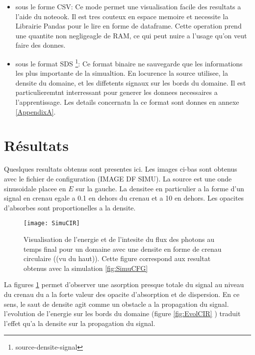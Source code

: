 \begin{itemize}
 \item sous le forme CSV: Ce mode permet une visualisation facile des resultats a l'aide du noteook. Il est tres couteux en espace memoire et necessite la Librairie Pandas pour le lire en forme de dataframe. Cette operation prend une quantite non negligeagle de RAM, ce qui peut nuire a l'usage qu'on veut faire des donnes.
 
 \item sous le format SDS \footnote{source-densite-signal}: Ce format binaire ne sauvegarde que les informations les plus importante de la simualtion. En locurence la source utilisee, la densite du domaine, et les diffetents signaux sur les bords du domaine. Il est particulieremtnt interressant pour generer les donnees necessaires a l'apprentissage. Les details concernatn la ce format sont donnes en annexe \ref{AppendixA}.
\end{itemize}


\section{Résultats}

Queslques resultats obtenus sont presentes ici. Les images ci-bas sont obtenus avec le fichier de configuration (IMAGE DF SIMU). La source est une onde sinusoidale placee en $E$ sur la gauche. La densitee en particulier a la forme d'un signal en crenau egale a 0.1 en dehors du crenau et a 10 en dehors. Les opacites d'absorbes sont proportionelles a la densite.

\begin{figure}[!h]
\centering
\texttt{[image: SimuCIR]} 
\decoRule
\caption[SimuCIR]{Visualisation de l'energie et de l'intesite du flux des photons au temps final pour un domaine avec une densite en forme de crenau circulaire ((vu du haut)). Cette figure correspond aux resultat obtenus avec la simulation \ref{fig:SimuCFG}}
\label{fig:SimuCIR}
\end{figure}

La figures \ref{fig:SimuCIR} permet d'observer une asorption presque totale du signal au niveau du crenau du a la forte valeur des opacite d'absorption et de dispersion. En ce sens, le saut de densite agit comme un obstacle a la propagation du signal. l'evolution de l'energie sur les bords  du domaine (figure \ref{fig:EvolCIR} ) traduit l'effet qu'a la densite sur la propagation du signal.

